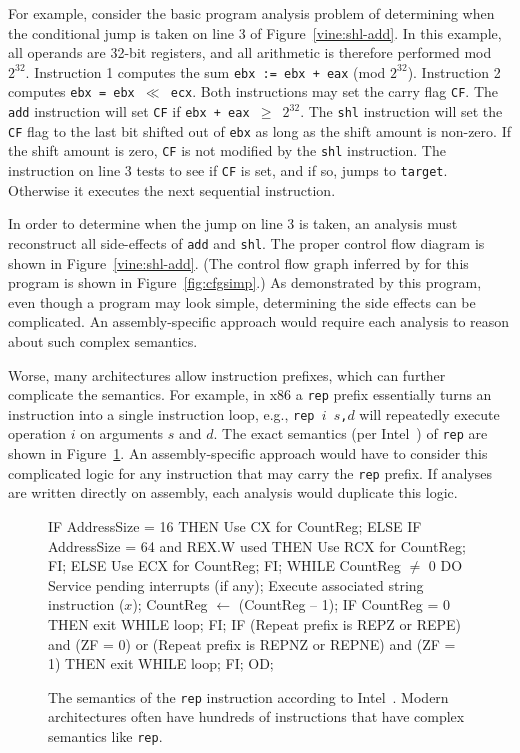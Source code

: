 For example, consider the basic program analysis problem of
determining when the conditional jump is taken on line 3 of
Figure~\ref{vine:shl-add}. In this example, all operands are 32-bit
registers, and all arithmetic is therefore performed mod
$2^{32}$. Instruction 1 computes the sum {\tt ebx := ebx + eax} (mod
$2^{32}$).  Instruction 2 computes {\tt ebx = ebx $\ll$ ecx}.  Both
instructions may set the carry flag {\tt CF}. The {\tt add}
instruction will set {\tt CF} if {\tt ebx + eax $\geq$ $2^{32}$}.  The
{\tt shl} instruction will set the {\tt CF} flag to the last bit
shifted out of \texttt{ebx} as long as the shift amount is non-zero.
If the shift amount is zero, \texttt{CF} is not modified by the
\texttt{shl} instruction. The instruction on line 3 tests to see if
{\tt CF} is set, and if so, jumps to {\tt target}. Otherwise it
executes the next sequential instruction.

In order to determine when the jump on line 3 is taken, an analysis
must reconstruct all side-effects of {\tt add} and {\tt shl}.  The
proper control flow diagram is shown in Figure~\ref{vine:shl-add}.
(The control flow graph inferred by \bap for this program is shown in
Figure~\ref{fig:cfgsimp}.) As demonstrated by this program, even
though a program may look simple, determining the side effects can be
complicated. An assembly-specific approach would require each analysis
to reason about such complex semantics.


Worse, many architectures allow instruction prefixes, which can
further complicate the semantics. For example, in x86 a {\tt rep}
prefix essentially turns an instruction into a single instruction
loop, e.g., {\tt rep $i$ $s$,$d$} will repeatedly execute operation
$i$ on arguments $s$ and $d$.  The exact semantics (per
Intel~\cite{intel:x86}) of {\tt rep} are shown in
Figure~\ref{vine:rep}. An assembly-specific approach would have to
consider this complicated logic for any instruction that may carry the
{\tt rep} prefix. If analyses are written directly on assembly, each
analysis would duplicate this logic.


\begin{figure}
\begin{footnotesize}
\begin{code}
  IF AddressSize = 16 
  THEN 
     Use CX for CountReg; 
  ELSE IF AddressSize = 64 and REX.W used 
     THEN Use RCX for CountReg; FI; 
  ELSE 
     Use ECX for CountReg; 
  FI; 
  WHILE CountReg $\neq$ 0 
  DO 
      Service pending interrupts (if any); 
      Execute associated string instruction ($x$);  
      CountReg $\leftarrow$ (CountReg – 1); 
      IF CountReg = 0 
      THEN exit WHILE loop; FI; 
      IF (Repeat prefix is REPZ or REPE) and (ZF = 0) 
         or (Repeat prefix is REPNZ or REPNE) and (ZF = 1) 
      THEN exit WHILE loop; FI; 
  OD; 
\end{code}
\end{footnotesize}
\caption{The semantics of the {\tt rep} instruction according to
  Intel~\cite{intel:x86}. Modern architectures often have hundreds of
  instructions that have complex semantics like {\tt rep}.}
\label{vine:rep}
\end{figure}

